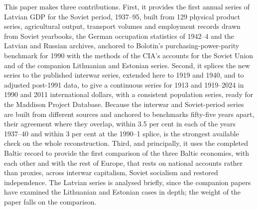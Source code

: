 This paper makes three contributions. First, it provides the first annual series of Latvian GDP for the Soviet period, 1937--95, built from 129 physical product series, agricultural output, transport volumes and employment records drawn from Soviet yearbooks, the German occupation statistics of 1942--4 and the Latvian and Russian archives, anchored to Bolotin's purchasing-power-parity benchmark for 1990 with the methods of the CIA's accounts for the Soviet Union and of the companion Lithuanian and Estonian series. Second, it splices the new series to the published interwar series, extended here to 1919 and 1940, and to adjusted post-1991 data, to give a continuous series for 1913 and 1919--2024 in 1990 and 2011 international dollars, with a consistent population series, ready for the Maddison Project Database. Because the interwar and Soviet-period series are built from different sources and anchored to benchmarks fifty-five years apart, their agreement where they overlap, within 3.5 per cent in each of the years 1937--40 and within 3 per cent at the 1990--1 splice, is the strongest available check on the whole reconstruction. Third, and principally, it uses the completed Baltic record to provide the first comparison of the three Baltic economies, with each other and with the rest of Europe, that rests on national accounts rather than proxies, across interwar capitalism, Soviet socialism and restored independence. The Latvian series is analysed briefly, since the companion papers have examined the Lithuanian and Estonian cases in depth; the weight of the paper falls on the comparison.

